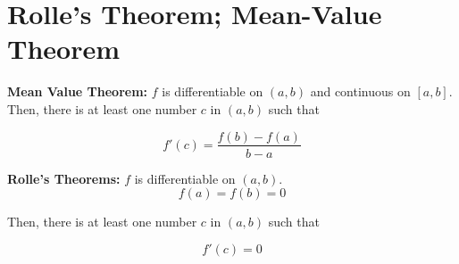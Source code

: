 \section{Rolle’s Theorem; Mean-Value Theorem}

\begin{myframe}[arc=10pt,auto outer arc]
\textbf{Mean Value Theorem:} $f$ is differentiable on $(a, b)$ and continuous on $[a, b]$. Then, there is at least one number $c$ in $(a, b)$ such that
		
		\[ f'(c) = \frac{f(b) - f(a)}{b - a} \]

\end{myframe}




\begin{myframe}[arc=10pt,auto outer arc]
\textbf{Rolle’s Theorems:} $f$ is differentiable on $(a, b)$.
		\[ f(a) = f(b) = 0\]
		
		Then, there is at least one number $c$ in $(a, b)$ such that 
		
		\[ f'(c) = 0\]

\end{myframe}


